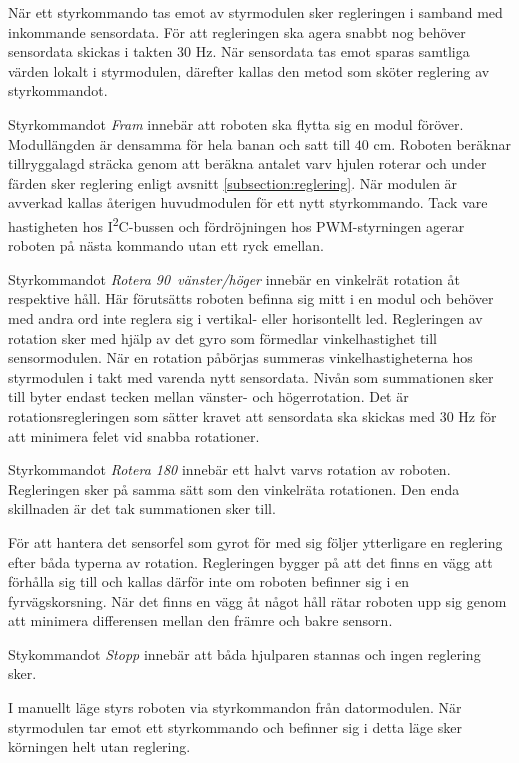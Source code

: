 \documentclass[11pt]{article}
\begin{document}
\begin{flushleft}
\begin{description}[style=unboxed, leftmargin=0cm]
När ett styrkommando tas emot av styrmodulen sker regleringen i samband med inkommande sensordata. För att regleringen ska agera snabbt nog behöver sensordata skickas i takten $30$ Hz. När sensordata tas emot sparas samtliga värden lokalt i styrmodulen, därefter kallas den metod som sköter reglering av styrkommandot. 

Styrkommandot \textit{Fram} innebär att roboten ska flytta sig en modul föröver. Modullängden är densamma för hela banan och satt till $40$ cm. Roboten beräknar tillryggalagd sträcka genom att beräkna antalet varv hjulen roterar och under färden sker reglering enligt avsnitt \ref{subsection:reglering}. När modulen är avverkad kallas återigen huvudmodulen för ett nytt styrkommando. Tack vare hastigheten hos I\textsuperscript{2}C-bussen och fördröjningen hos PWM-styrningen agerar roboten på nästa kommando utan ett ryck emellan. 

Styrkommandot \textit{Rotera 90\textdegree\ vänster/höger} innebär en vinkelrät rotation åt respektive håll. Här förutsätts roboten befinna sig mitt i en modul och behöver med andra ord inte reglera sig i vertikal- eller horisontellt led. Regleringen av rotation sker med hjälp av det gyro som förmedlar vinkelhastighet till sensormodulen. När en rotation påbörjas summeras vinkelhastigheterna hos styrmodulen i takt med varenda nytt sensordata. Nivån som summationen sker till byter endast tecken mellan vänster- och högerrotation. Det är rotationsregleringen som sätter kravet att sensordata ska skickas med $30$ Hz för att minimera felet vid snabba rotationer. 

Styrkommandot \textit{Rotera 180\textdegree} innebär ett halvt varvs rotation av roboten. Regleringen sker på samma sätt som den vinkelräta rotationen. Den enda skillnaden är det tak summationen sker till. 

För att hantera det sensorfel som gyrot för med sig följer ytterligare en reglering efter båda typerna av rotation. Regleringen bygger på att det finns en vägg att förhålla sig till och kallas därför inte om roboten befinner sig i en fyrvägskorsning. När det finns en vägg åt något håll rätar roboten upp sig genom att minimera differensen mellan den främre och bakre sensorn. 

Stykommandot \textit{Stopp} innebär att båda hjulparen stannas och ingen reglering sker. 

\item[Manuellt läge] I manuellt läge styrs roboten via styrkommandon från datormodulen. När styrmodulen tar emot ett styrkommando och befinner sig i detta läge sker körningen helt utan reglering. 


\end{description}
\end{flushleft}
\end{document}
